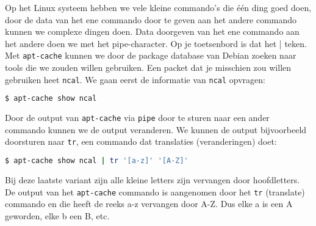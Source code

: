 Op het Linux systeem hebben we vele kleine commando's die \'e\'en ding goed doen, door de data van het ene commando door te geven aan het andere commando kunnen we complexe dingen doen. Data doorgeven van het ene commando aan het andere doen we met het pipe-character. Op je toetsenbord is dat het | teken. Met \texttt{apt-cache} kunnen we door de package database van Debian zoeken naar tools die we zouden willen gebruiken. Een packet dat je misschien zou willen gebruiken heet \texttt{ncal}. We gaan eerst de informatie van \texttt{ncal} opvragen:

\begin{lstlisting}[language=bash]
$ apt-cache show ncal
\end{lstlisting}

Door de output van \texttt{apt-cache} via \texttt{pipe} door te sturen naar een ander commando kunnen we de output veranderen. We kunnen de output bijvoorbeeld doorsturen naar \texttt{tr}, een commando dat translaties (veranderingen) doet:

\begin{lstlisting}[language=bash]
$ apt-cache show ncal | tr '[a-z]' '[A-Z]'
\end{lstlisting}

Bij deze laatste variant zijn alle kleine letters zijn vervangen door hoofdletters. De output van het \texttt{apt-cache} commando is aangenomen door het \texttt{tr} (translate) commando en die heeft de reeks a-z vervangen door A-Z. Dus elke a is een A geworden, elke b een B, etc.
 
